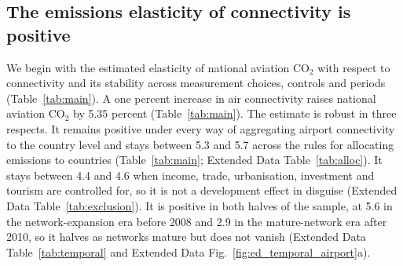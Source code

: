 \documentclass[12pt]{extarticle}
\begin{document}
\subsection*{The emissions elasticity of connectivity is positive}
We begin with the estimated elasticity of national aviation CO$_2$ with respect to connectivity and
its stability across measurement choices, controls and periods
(Table~\ref{tab:main}). A one percent increase in air connectivity raises national aviation CO$_2$
by 5.35 percent (Table~\ref{tab:main}). The estimate is
robust in three respects. It remains positive under every way of
aggregating airport connectivity to the country level and stays between
5.3 and 5.7 across the rules for allocating emissions to countries
(Table~\ref{tab:main}; Extended Data Table~\ref{tab:alloc}). It stays
between 4.4 and 4.6 when income, trade, urbanisation, investment and
tourism are controlled for, so it is not a development effect in disguise
(Extended Data Table~\ref{tab:exclusion}). It is positive in both halves
of the sample, at 5.6 in the network-expansion era before 2008 and 2.9 in
the mature-network era after 2010, so it halves as networks mature but
does not vanish (Extended Data Table~\ref{tab:temporal} and Extended Data
Fig.~\ref{fig:ed_temporal_airport}a).
\end{document}
